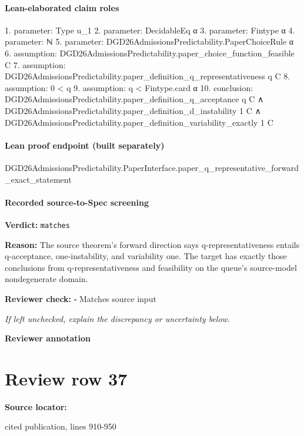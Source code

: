 \documentclass[10pt]{article}
\newcommand{\reviewerbox}{%
  \par\noindent\fbox{\parbox{0.96\linewidth}{\rule{0pt}{0.38in}}}\par
}
\newcommand{\reviewmatch}[1]{%
  \par\noindent\textbf{Reviewer check:} $\square$\; #1\par
  \noindent\emph{If left unchecked, explain the discrepancy or uncertainty below.}\par
}
\begin{document}
\paragraph{Lean-elaborated claim roles}\begin{ReviewVerbatim}
1. parameter: Type u_1
2. parameter: DecidableEq α
3. parameter: Fintype α
4. parameter: ℕ
5. parameter: DGD26AdmissionsPredictability.PaperChoiceRule α
6. assumption: DGD26AdmissionsPredictability.paper_choice_function_feasible C
7. assumption: DGD26AdmissionsPredictability.paper_definition_q_representativeness q C
8. assumption: 0 < q
9. assumption: q < Fintype.card α
10. conclusion: DGD26AdmissionsPredictability.paper_definition_q_acceptance q C ∧
  DGD26AdmissionsPredictability.paper_definition_d_instability 1 C ∧
    DGD26AdmissionsPredictability.paper_definition_variability_exactly 1 C
\end{ReviewVerbatim}

\paragraph{Lean proof endpoint (built separately)}\begin{ReviewVerbatim}
DGD26AdmissionsPredictability.PaperInterface.paper_q_representative_forward_exact_statement
\end{ReviewVerbatim}

\paragraph{Recorded source-to-Spec screening}
\textbf{Verdict:} \texttt{matches}
\\
{\raggedright
\textbf{Reason:} The source theorem's forward direction says q-\allowbreak{}representativeness entails q-\allowbreak{}acceptance, one-\allowbreak{}instability, and variability one.\allowbreak{} The target has exactly those conclusions from q-\allowbreak{}representativeness and feasibility on the queue's source-\allowbreak{}model nondegenerate domain.\allowbreak{}
\par}
\reviewmatch{Matches source input}
\noindent\textbf{Reviewer annotation}\par
\reviewerbox
\clearpage
\hypertarget{source-claim-3d12c759820fa6e4}{}
\section*{Review row 37}
\textbf{Source locator:} {\footnotesize\raggedright cited publication, lines 910-\allowbreak{}950\par}
\end{document}
